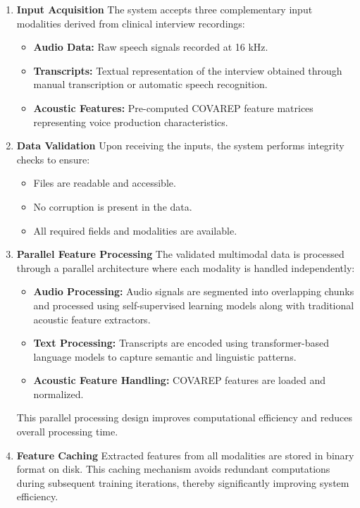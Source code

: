 \documentclass[12pt]{article}
\begin{document}
	\begin{enumerate}

    \item \textbf{Input Acquisition}  
    The system accepts three complementary input modalities derived from clinical interview recordings:
    \begin{itemize}
        \item \textbf{Audio Data:} Raw speech signals recorded at 16 kHz.
        \item \textbf{Transcripts:} Textual representation of the interview obtained through manual transcription or automatic speech recognition.
        \item \textbf{Acoustic Features:} Pre-computed COVAREP feature matrices representing voice production characteristics.
    \end{itemize}

    \item \textbf{Data Validation}  
    Upon receiving the inputs, the system performs integrity checks to ensure:
    \begin{itemize}
        \item Files are readable and accessible.
        \item No corruption is present in the data.
        \item All required fields and modalities are available.
    \end{itemize}

    \item \textbf{Parallel Feature Processing}  
    The validated multimodal data is processed through a parallel architecture where each modality is handled independently:
    \begin{itemize}
        \item \textbf{Audio Processing:} Audio signals are segmented into overlapping chunks and processed using self-supervised learning models along with traditional acoustic feature extractors.
        \item \textbf{Text Processing:} Transcripts are encoded using transformer-based language models to capture semantic and linguistic patterns.
        \item \textbf{Acoustic Feature Handling:} COVAREP features are loaded and normalized.
    \end{itemize}
    This parallel processing design improves computational efficiency and reduces overall processing time.

    \item \textbf{Feature Caching}  
    Extracted features from all modalities are stored in binary format on disk. This caching mechanism avoids redundant computations during subsequent training iterations, thereby significantly improving system efficiency.


\end{enumerate}
\end{document}
